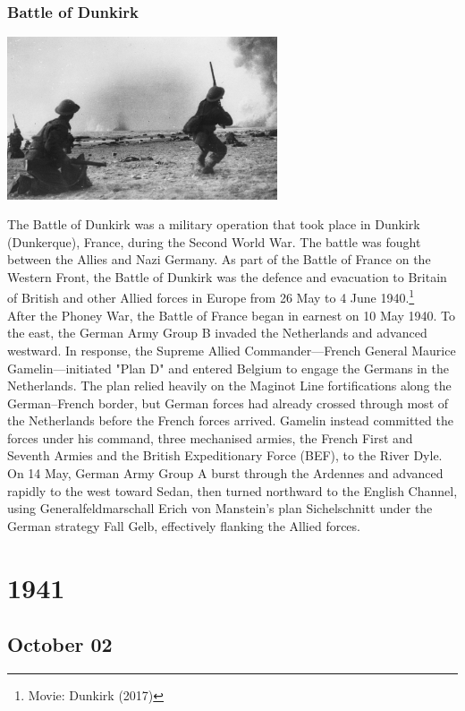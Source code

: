 \documentclass[11pt]{report}
\begin{document}
\subsection{Battle of Dunkirk}
\vspace{2mm}\begin{center}\includegraphics[width=8cm]{./img/dunkirk.jpg}\end{center}
The Battle of Dunkirk was a military operation that took place in Dunkirk (Dunkerque), France, during the Second World War. The battle was fought between the Allies and Nazi Germany. As part of the Battle of France on the Western Front, the Battle of Dunkirk was the defence and evacuation to Britain of British and other Allied forces in Europe from 26 May to 4 June 1940.\footnote{Movie: Dunkirk (2017)}\\ \indent After the Phoney War, the Battle of France began in earnest on 10 May 1940. To the east, the German Army Group B invaded the Netherlands and advanced westward. In response, the Supreme Allied Commander—French General Maurice Gamelin—initiated "Plan D" and entered Belgium to engage the Germans in the Netherlands. The plan relied heavily on the Maginot Line fortifications along the German–French border, but German forces had already crossed through most of the Netherlands before the French forces arrived. Gamelin instead committed the forces under his command, three mechanised armies, the French First and Seventh Armies and the British Expeditionary Force (BEF), to the River Dyle. On 14 May, German Army Group A burst through the Ardennes and advanced rapidly to the west toward Sedan, then turned northward to the English Channel, using Generalfeldmarschall Erich von Manstein's plan Sichelschnitt under the German strategy Fall Gelb, effectively flanking the Allied forces.

\chapter{1941}
\section{October 02}
\end{document}
